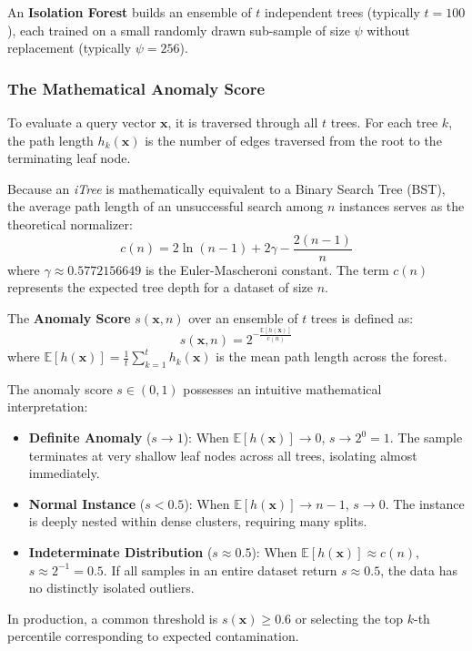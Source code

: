 An \textbf{Isolation Forest} builds an ensemble of $t$ independent trees (typically $t = 100$), each trained on a small randomly drawn sub-sample of size $\psi$ without replacement (typically $\psi = 256$).

\subsubsection{The Mathematical Anomaly Score}

To evaluate a query vector $\mathbf{x}$, it is traversed through all $t$ trees. For each tree $k$, the path length $h_k(\mathbf{x})$ is the number of edges traversed from the root to the terminating leaf node.

Because an \textit{iTree} is mathematically equivalent to a Binary Search Tree (BST), the average path length of an unsuccessful search among $n$ instances serves as the theoretical normalizer:
\begin{equation}
c(n) = 2 \ln(n - 1) + 2\gamma - \frac{2(n - 1)}{n}\label{eq:c_factor}
\end{equation}
where $\gamma \approx 0.5772156649$ is the Euler-Mascheroni constant. The term $c(n)$ represents the expected tree depth for a dataset of size $n$.

The \textbf{Anomaly Score} $s(\mathbf{x}, n)$ over an ensemble of $t$ trees is defined as:
\begin{equation}
s(\mathbf{x}, n) = 2^{-\frac{\mathbb{E}[h(\mathbf{x})]}{c(n)}}\label{eq:iforest_score}
\end{equation}
where $\mathbb{E}[h(\mathbf{x})] = \frac{1}{t}\sum_{k=1}^t h_k(\mathbf{x})$ is the mean path length across the forest.

The anomaly score $s \in (0, 1)$ possesses an intuitive mathematical interpretation:
\begin{itemize}
    \item \textbf{Definite Anomaly} ($s \to 1$): When $\mathbb{E}[h(\mathbf{x})] \to 0$, $s \to 2^0 = 1$. The sample terminates at very shallow leaf nodes across all trees, isolating almost immediately.
    \item \textbf{Normal Instance} ($s < 0.5$): When $\mathbb{E}[h(\mathbf{x})] \to n - 1$, $s \to 0$. The instance is deeply nested within dense clusters, requiring many splits.
    \item \textbf{Indeterminate Distribution} ($s \approx 0.5$): When $\mathbb{E}[h(\mathbf{x})] \approx c(n)$, $s \approx 2^{-1} = 0.5$. If all samples in an entire dataset return $s \approx 0.5$, the data has no distinctly isolated outliers.
\end{itemize}
In production, a common threshold is $s(\mathbf{x}) \ge 0.6$ or selecting the top $k$-th percentile corresponding to expected contamination.

